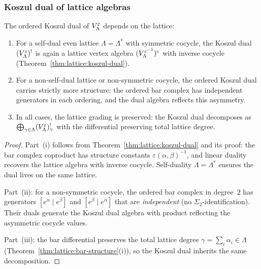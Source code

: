 \subsubsection{Koszul dual of lattice algebras}

\begin{theorem}
\label{thm:lattice-ordered-koszul-dual}
The ordered Koszul dual of $V_\Lambda^\varepsilon$ depends on
the lattice:
\begin{enumerate}[label=\textup{(\roman*)}]
\item For a self-dual even lattice $\Lambda = \Lambda^*$
 with symmetric cocycle, the Koszul dual
 $(V_\Lambda^\varepsilon)^!$ is again a lattice vertex algebra
 $(V_\Lambda^{\varepsilon^{-1}})^c$ with inverse cocycle
 \textup{(}Theorem~\textup{\ref{thm:lattice:koszul-dual}}\textup{)}.
\item For a non-self-dual lattice or non-symmetric cocycle, the
 ordered Koszul dual carries strictly more structure: the
 ordered bar complex has independent generators in each ordering,
 and the dual algebra reflects this asymmetry.
\item In all cases, the lattice grading is preserved: the Koszul dual
 decomposes as $\bigoplus_{\gamma \in \Lambda}
 (V_\Lambda^\varepsilon)^!_\gamma$ with the differential
 preserving total lattice degree.
\end{enumerate}
\end{theorem}

\begin{proof}
Part~(i) follows from Theorem~\ref{thm:lattice:koszul-dual} and its
proof: the bar complex coproduct has structure constants
$\varepsilon(\alpha,\beta)^{-1}$, and linear duality recovers the
lattice algebra with inverse cocycle. Self-duality $\Lambda = \Lambda^*$
ensures the dual lives on the same lattice.

Part~(ii): for a non-symmetric cocycle, the ordered bar complex in
degree~$2$ has generators $[e^\alpha \mid e^\beta]$ and
$[e^\beta \mid e^\alpha]$ that are \emph{independent} (no
$\Sigma_2$-identification). Their duals generate the Koszul dual
algebra with product reflecting the asymmetric cocycle values.

Part~(iii): the bar differential preserves the total lattice degree
$\gamma = \sum_i \alpha_i \in \Lambda$
(Theorem~\ref{thm:lattice:bar-structure}(i)), so the Koszul dual
inherits the same decomposition.
\end{proof}

